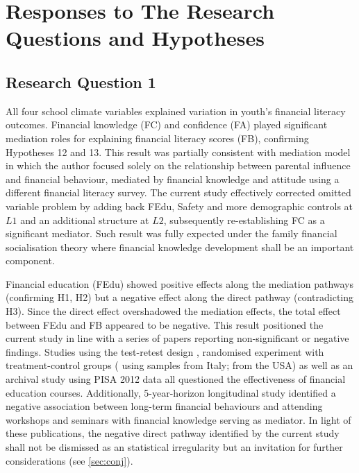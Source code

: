 \documentclass[a4paper,11pt,UKenglish,twoside,openright]{report}\usepackage[]{graphicx}\usepackage[]{color}
\begin{document}
\section{Responses to The Research Questions and Hypotheses}

\subsection{Research Question 1}

All four school climate variables explained variation in youth's financial literacy outcomes. Financial knowledge (FC) and confidence (FA) played significant mediation roles for explaining financial literacy scores (FB), confirming Hypotheses 12 and 13. This result was partially consistent with  mediation model in which the author focused solely on the relationship between parental influence and financial behaviour, mediated by financial knowledge and attitude using a different financial literacy survey. The current study effectively corrected  omitted variable problem by adding back FEdu, Safety and more demographic controls at $L1$ and an additional structure at $L2$, subsequently re-establishing FC as a significant mediator. Such result was fully expected under the family financial socialisation theory \parencite{danes:2007} where financial knowledge development shall be an important component.

Financial education (FEdu) showed positive effects along the mediation pathways (confirming H1, H2) but a negative effect along the direct pathway (contradicting H3). Since the direct effect overshadowed the mediation effects, the total effect between FEdu and FB appeared to be negative. This result positioned the current study in line with a series of papers reporting non-significant or negative findings. Studies using the test-retest design \parencite{mandell:2009}, randomised experiment with treatment-control groups (\textcite{becchetti:2013} using samples from Italy; \textcite{collins:2013} from the USA) as well as an archival study using PISA 2012 data \parencite{farinella:2017} all questioned the effectiveness of financial education courses. Additionally,  5-year-horizon longitudinal study identified a negative association between long-term financial behaviours and attending workshops and seminars with financial knowledge serving as mediator. In light of these publications, the negative direct pathway identified by the current study shall not be dismissed as an statistical irregularity but an invitation for further considerations (see \cref{sec:conj}).
\end{document}
